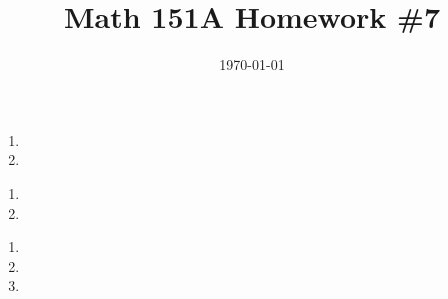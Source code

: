\documentclass{article}
\date{\today}
\title{Math 151A Homework \#7}
\begin{document}
\maketitle

\begin{prob}
\end{prob}
\begin{enumerate}[label=(\alph*)]
    \item
    \item
\end{enumerate}


\bigskip
\begin{prob}
\end{prob}

\bigskip
\begin{prob}
\end{prob}

\bigskip
\begin{prob}
\end{prob}

\bigskip
\begin{prob}
\end{prob}
\begin{enumerate}[label=(\alph*)]
    \item
    \item
\end{enumerate}


\bigskip
\begin{prob}
\end{prob}

\bigskip
\begin{prob}
\end{prob}
\begin{enumerate}[label=(\alph*)]
    \item
    \item
    \item
\end{enumerate}


\end{document}
